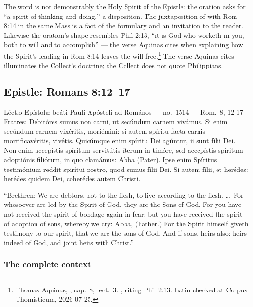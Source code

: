 The word  is not
demonstrably the Holy Spirit of the Epistle: the oration asks for ``a spirit of
thinking and doing,'' a disposition. The juxtaposition of  with
Rom 8:14 in the same Mass is a fact of the formulary and an invitation to the
reader. Likewise the
oration's shape resembles Phil 2:13, ``it is God who worketh in you, both to
will and to accomplish'' --- the verse Aquinas cites when explaining how the
Spirit's leading in Rom 8:14 leaves the will free.\footnote{Thomas Aquinas,
, cap.\ 8, lect.\ 3: , citing Phil 2:13. Latin checked at Corpus Thomisticum,
2026-07-25.} The verse Aquinas cites illuminates the Collect's doctrine; the
Collect does not quote Philippians.

\subsection{Epistle: Romans 8:12--17 }

\begin{appointed}{Léctio Epístolæ beáti Pauli Apóstoli ad Romános --- no.\ 1514 --- Rom.\ 8, 12-17}
Fratres: Debitóres sumus non carni, ut secúndum carnem vivámus. Si enim
secúndum carnem vixéritis, moriémini: si autem spíritu facta carnis
mortificavéritis, vivétis. Quicúmque enim spíritu Dei agúntur, ii sunt fílii
Dei. Non enim accepístis spíritum servitútis íterum in timóre, sed accepístis
spíritum adoptiónis filiórum, in quo clamámus: Abba (Pater). Ipse enim Spíritus
testimónium reddit spirítui nostro, quod sumus fílii Dei. Si autem fílii, et
herédes: herédes quidem Dei, coherédes autem Christi.
\end{appointed}

\begin{englishwitness}
``Brethren: We are debtors, not to the flesh, to live according to the flesh.
\dots\ For whosoever are led by the Spirit of God, they are the Sons of God.
For you have not received the spirit of bondage again in fear: but you have
received the spirit of adoption of sons, whereby we cry: Abba, (Father.) For
the Spirit himself giveth testimony to our spirit, that we are the sons of God.
And if sons, heirs also: heirs indeed of God, and joint heirs with Christ.''
\end{englishwitness}

\subsubsection*{The complete context}

